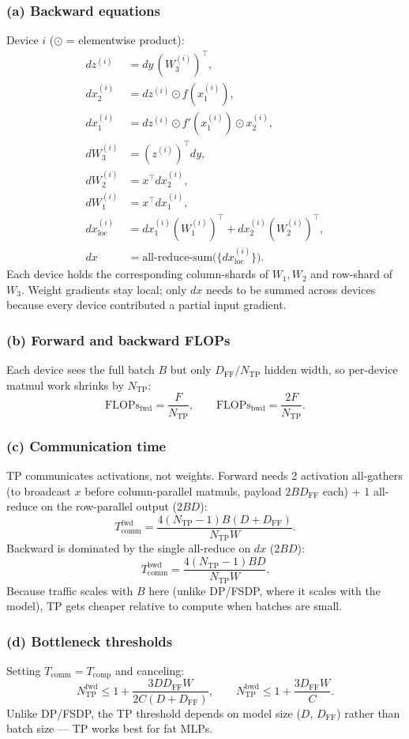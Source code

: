 \documentclass[11pt]{article}
\newcommand{\subquestion}[1]{\subsubsection*{#1}}
\begin{document}
\subquestion{(a) Backward equations}
Device $i$ ($\odot$ = elementwise product):
\begin{align*}
  dz^{(i)} &= dy\,(W_{3}^{(i)})^{\top}, \\
  dx_{2}^{(i)} &= dz^{(i)} \odot f(x_{1}^{(i)}), \\
  dx_{1}^{(i)} &= dz^{(i)} \odot f'(x_{1}^{(i)}) \odot x_{2}^{(i)}, \\
  dW_{3}^{(i)} &= (z^{(i)})^{\top} dy, \\
  dW_{2}^{(i)} &= x^{\top} dx_{2}^{(i)}, \\
  dW_{1}^{(i)} &= x^{\top} dx_{1}^{(i)}, \\
  dx_{\mathrm{loc}}^{(i)} &= dx_{1}^{(i)} (W_{1}^{(i)})^{\top} + dx_{2}^{(i)} (W_{2}^{(i)})^{\top}, \\
  dx &= \mathrm{all\text{-}reduce\text{-}sum}\bigl(\{dx_{\mathrm{loc}}^{(i)}\}\bigr).
\end{align*}
Each device holds the corresponding column-shards of $W_1, W_2$ and row-shard of $W_3$. Weight gradients stay local; only $dx$ needs to be summed across devices because every device contributed a partial input gradient.

\subquestion{(b) Forward and backward FLOPs}
Each device sees the full batch $B$ but only $D_{\mathrm{FF}}/N_{\mathrm{TP}}$ hidden width, so per-device matmul work shrinks by $N_{\mathrm{TP}}$:
\[ \mathrm{FLOPs}_{\mathrm{fwd}} = \frac{F}{N_{\mathrm{TP}}}, \qquad \mathrm{FLOPs}_{\mathrm{bwd}} = \frac{2F}{N_{\mathrm{TP}}}. \]

\subquestion{(c) Communication time}
TP communicates activations, not weights. Forward needs 2 activation all-gathers (to broadcast $x$ before column-parallel matmuls, payload $2BD_{\mathrm{FF}}$ each) + 1 all-reduce on the row-parallel output ($2BD$):
\[ T_{\mathrm{comm}}^{\mathrm{fwd}} = \frac{4(N_{\mathrm{TP}}{-}1)B(D+D_{\mathrm{FF}})}{N_{\mathrm{TP}} W}. \]
Backward is dominated by the single all-reduce on $dx$ ($2BD$):
\[ T_{\mathrm{comm}}^{\mathrm{bwd}} = \frac{4(N_{\mathrm{TP}}{-}1)BD}{N_{\mathrm{TP}} W}. \]
Because traffic scales with $B$ here (unlike DP/FSDP, where it scales with the model), TP gets cheaper relative to compute when batches are small.

\subquestion{(d) Bottleneck thresholds}
Setting $T_{\mathrm{comm}} = T_{\mathrm{comp}}$ and canceling:
\[ N_{\mathrm{TP}}^{\mathrm{fwd}} \le 1 + \frac{3DD_{\mathrm{FF}}W}{2C(D+D_{\mathrm{FF}})}, \qquad N_{\mathrm{TP}}^{\mathrm{bwd}} \le 1 + \frac{3D_{\mathrm{FF}}W}{C}. \]
Unlike DP/FSDP, the TP threshold depends on model size ($D$, $D_{\mathrm{FF}}$) rather than batch size --- TP works best for fat MLPs.
\end{document}
